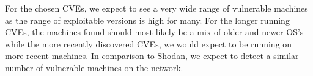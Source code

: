 For the chosen CVEs, we expect to see a very wide range of vulnerable machines as the range of exploitable versions is high for many. For the longer running CVEs, the machines found should most likely be a mix of older and newer OS's while the more recently discovered CVEs, we would expect to be running on more recent machines. In comparison to Shodan, we expect to detect a similar number of vulnerable machines on the network. 